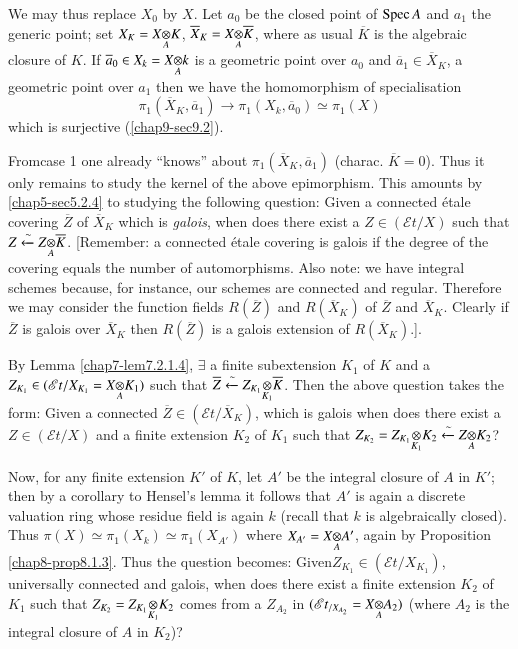 We may thus replace $X_{0}$ by $X$. Let $a_{0}$ be the closed point of
$\operatorname{Spec} A$ and $a_{1}$ the generic point; set $X_{K}=\foprod{X}{K}{A}$,
$\overline{X}_{K}=\foprod{X}{\overline{K}}{A}$, where as usual
$\overline{K}$ is the algebraic closure of $K$. If
$\overline{a}_{0}\in X_{k}=\foprod{X}{k}{A}$ is a geometric point over
$a_{0}$ and $\overline{a}_{1}\in\overline{X}_{K}$, a geometric point
over $a_{1}$ then we have the homomorphism of specialisation 
$$
\pi_{1}(\overline{X}_{K},\overline{a}_{1})\to \pi_{1}(X_{k},\overline{a}_{0})\simeq \pi_{1}(X)
$$
which is surjective (\ref{chap9-sec9.2}).

From\pageoriginale case 1 one already ``knows'' about
$\pi_{1}(\overline{X}_{K},\overline{a}_{1})$
(charac. $\overline{K}=0$). Thus it only remains to study the kernel
of the above epimorphism. This amounts by \ref{chap5-sec5.2.4} to studying
the following question: Given a connected \'etale covering
$\overline{Z}$ of $\overline{X}_{K}$ which is {\em galois}, when does
there exist a $Z\in(\mathscr{E}t/X)$ such that
$Z\xleftarrow{\sim}\foprod{Z}{\overline{K}}{A}$. [Remember: a
connected \'etale covering is galois if the degree of the covering
equals the number of automorphisms. Also note: we have integral
schemes because, for instance, our schemes are connected and
regular. Therefore we may consider the function fields
$R(\overline{Z})$ and $R(\overline{X}_{K})$ of $\overline{Z}$ and
$\overline{X}_{K}$. Clearly if $\overline{Z}$ is galois over
$\overline{X}_{K}$ then $R(\overline{Z})$ is a galois extension of
$R(\overline{X}_{K})$.]. 

By Lemma \ref{chap7-lem7.2.1.4}, $\exists$ a finite subextension $K_{1}$ of
$K$ and a $Z_{K_{1}}\in(\mathscr{E}t/X_{K_{1}}\break =\foprod{X}{K_{1}}{A})$
such that
$\overline{Z}\xleftarrow{\sim}\foprod{Z_{K_{1}}}{\overline{K}}{K_{1}}$. 
Then the above question takes the form: Given a connected
$\overline{Z}\in (\mathscr{E}t/\overline{X}_{K})$, which is galois
when does there exist a $Z\in(\mathscr{E}t/X)$ and a finite extension
$K_{2}$ of $K_{1}$ such that
$Z_{K_{2}}=\foprod{Z_{K_{1}}}{K_{2}}{K_{1}}\xleftarrow{\sim} \foprod{Z}{K_{2}}{A}$? 

Now, for any finite extension $K'$ of $K$, let $A'$ be the integral
closure of $A$ in $K'$; then by a corollary to Hensel's lemma it
follows that $A'$ is again a discrete valuation ring whose residue
field is again $k$ (recall that $k$ is algebraically closed). Thus
$\pi(X)\simeq \pi_{1}(X_{k})\simeq\pi_{1}(X_{A'})$ where
$X_{A'}=\foprod{X}{A'}{A}$, again by Proposition \ref{chap8-prop8.1.3}. Thus
the question becomes: Given\pageoriginale $Z_{K_{1}}\in
(\mathscr{E}t/X_{K_{1}})$, universally connected and galois, when does
there exist a finite extension $K_{2}$ of $K_{1}$ such that
$Z_{K_{2}}=\foprod{Z_{K_{1}}}{K_{2}}{K_{1}}$ comes from a $Z_{A_{2}}$
in $(\mathscr{E}t_{/X_{A_{2}}}=\foprod{X}{A_{2}}{A})$ (where $A_{2}$ is
the integral closure of $A$ in $K_{2}$)?


